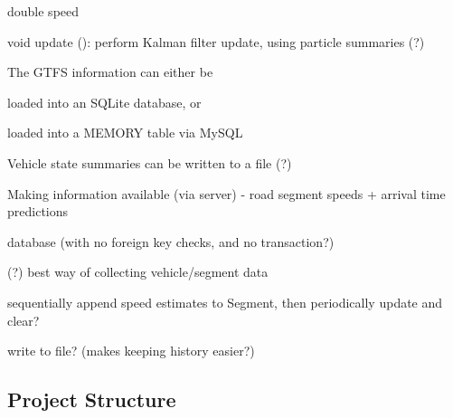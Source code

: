 \begin{DoxyItemize}
\begin{DoxyItemize}
\begin{DoxyItemize}
\item {\ttfamily double speed}
\item {\ttfamily void update ()}\+: perform Kalman filter update, using particle summaries (?)
\end{DoxyItemize}
\end{DoxyItemize}
\item The G\+T\+FS information can either be
\begin{DoxyItemize}
\item loaded into an S\+Q\+Lite database, or
\item loaded into a M\+E\+M\+O\+RY table via My\+S\+QL
\end{DoxyItemize}
\item Vehicle state summaries can be written to a file (?)
\item Making information available (via server) -\/ road segment speeds + arrival time predictions
\begin{DoxyItemize}
\item database (with no foreign key checks, and no transaction?)
\end{DoxyItemize}
\end{DoxyItemize}

(?) best way of collecting vehicle/segment data
\begin{DoxyItemize}
\item sequentially append speed estimates to {\ttfamily Segment}, then periodically update and clear?
\item write to file? (makes keeping history easier?)
\end{DoxyItemize}

\subsection*{Project Structure}


